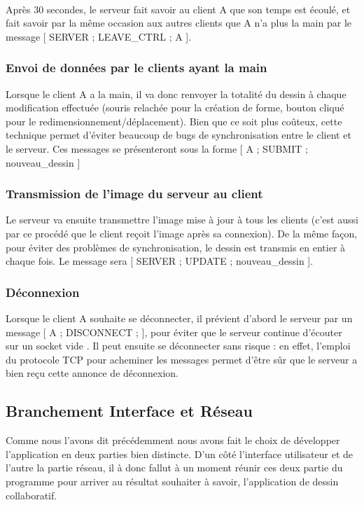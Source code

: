 \documentclass[a4paper,11pt]{article}
\begin{document}
\paragraph{} Après 30 secondes, le serveur fait savoir au client A que son temps est écoulé, et fait savoir par la même occasion aux autres clients que A n'a plus la main par le message [ SERVER ; LEAVE\_CTRL ; A ].

\subsubsection{Envoi de données par le clients ayant la main}
Lorsque le client A a la main, il va donc renvoyer la totalité du dessin à chaque modification effectuée (souris relachée pour la création de forme, bouton cliqué pour le redimensionnement/déplacement). Bien que ce soit plus coûteux, cette technique permet d'éviter beaucoup de bugs de synchronisation entre le client et le serveur. Ces messages se présenteront sous la forme [ A ; SUBMIT ; nouveau\_dessin ]

\subsubsection{Transmission de l'image du serveur au client}
Le serveur va ensuite transmettre l'image mise à jour à tous les clients (c'est aussi par ce procédé que le client reçoit l'image après sa connexion). De la même façon, pour éviter des problèmes de synchronisation, le dessin est transmis en entier à chaque fois. Le message sera [ SERVER ; UPDATE ; nouveau\_dessin ].

\subsubsection{Déconnexion}
Lorsque le client A souhaite se déconnecter, il prévient d'abord le serveur par un message [ A ; DISCONNECT ; ], pour éviter que le serveur continue d'écouter sur un socket \og vide \fg. Il peut ensuite se déconnecter sans risque : en effet, l'emploi du protocole TCP pour acheminer les messages permet d'être sûr que le serveur a bien reçu cette annonce de déconnexion.

\subsection{Branchement Interface et Réseau}
Comme nous l'avons dit précédemment nous avons fait le choix de développer l'application en deux parties bien distincte. D'un côté l'interface utilisateur et de l'autre la partie réseau, il à donc fallut à un moment réunir ces deux partie du programme pour arriver au résultat souhaiter à savoir, l'application de dessin collaboratif.
\end{document}

